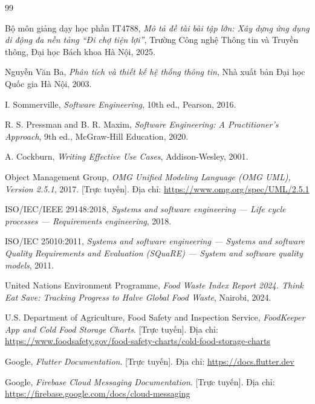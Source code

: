 \clearpage
{}
{}
\renewcommand{\bibname}{TÀI LIỆU THAM KHẢO}
\begin{thebibliography}{99}
\setlength{\itemsep}{2pt}

Bộ môn giảng dạy học phần IT4788, \emph{Mô tả đề tài bài tập lớn: Xây dựng ứng dụng di động đa nền tảng “Đi chợ tiện lợi”}, Trường Công nghệ Thông tin và Truyền thông, Đại học Bách khoa Hà Nội, 2025.

Nguyễn Văn Ba, \emph{Phân tích và thiết kế hệ thống thông tin}, Nhà xuất bản Đại học Quốc gia Hà Nội, 2003.

I. Sommerville, \emph{Software Engineering}, 10th ed., Pearson, 2016.

R. S. Pressman and B. R. Maxim, \emph{Software Engineering: A Practitioner's Approach}, 9th ed., McGraw-Hill Education, 2020.

A. Cockburn, \emph{Writing Effective Use Cases}, Addison-Wesley, 2001.

Object Management Group, \emph{OMG Unified Modeling Language (OMG UML), Version 2.5.1}, 2017. [Trực tuyến]. Địa chỉ: \url{https://www.omg.org/spec/UML/2.5.1}

ISO/IEC/IEEE 29148:2018, \emph{Systems and software engineering — Life cycle processes — Requirements engineering}, 2018.

ISO/IEC 25010:2011, \emph{Systems and software engineering — Systems and software Quality Requirements and Evaluation (SQuaRE) — System and software quality models}, 2011.

United Nations Environment Programme, \emph{Food Waste Index Report 2024. Think Eat Save: Tracking Progress to Halve Global Food Waste}, Nairobi, 2024.

U.S. Department of Agriculture, Food Safety and Inspection Service, \emph{FoodKeeper App and Cold Food Storage Charts}. [Trực tuyến]. Địa chỉ: \url{https://www.foodsafety.gov/food-safety-charts/cold-food-storage-charts}


Google, \emph{Flutter Documentation}. [Trực tuyến]. Địa chỉ: \url{https://docs.flutter.dev}

Google, \emph{Firebase Cloud Messaging Documentation}. [Trực tuyến]. Địa chỉ: \url{https://firebase.google.com/docs/cloud-messaging}


\end{thebibliography}
